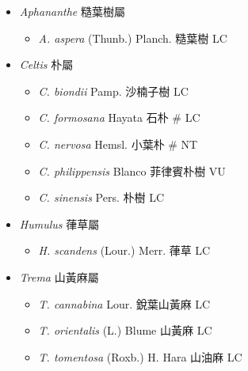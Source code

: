 
  \begin{itemize}
 \item[] \textit{Aphananthe} 糙葉樹屬
                                
  \begin{itemize}
        \item[] \textit{A. aspera} (Thunb.) Planch.  糙葉樹   LC
  \end{itemize}
 \item[] \textit{Celtis} 朴屬
                                
  \begin{itemize}
        \item[] \textit{C. biondii} Pamp.  沙楠子樹   LC
        \item[] \textit{C. formosana} Hayata  石朴  \# LC
        \item[] \textit{C. nervosa} Hemsl.  小葉朴  \# NT
        \item[] \textit{C. philippensis} Blanco  菲律賓朴樹   VU
        \item[] \textit{C. sinensis} Pers.  朴樹   LC
  \end{itemize}
 \item[] \textit{Humulus} 葎草屬
                                
  \begin{itemize}
        \item[] \textit{H. scandens} (Lour.) Merr.  葎草   LC
  \end{itemize}
 \item[] \textit{Trema} 山黃麻屬
                                
  \begin{itemize}
        \item[] \textit{T. cannabina} Lour.  銳葉山黃麻   LC
        \item[] \textit{T. orientalis} (L.) Blume  山黃麻   LC
        \item[] \textit{T. tomentosa} (Roxb.) H. Hara  山油麻   LC
  \end{itemize}
  \end{itemize}
